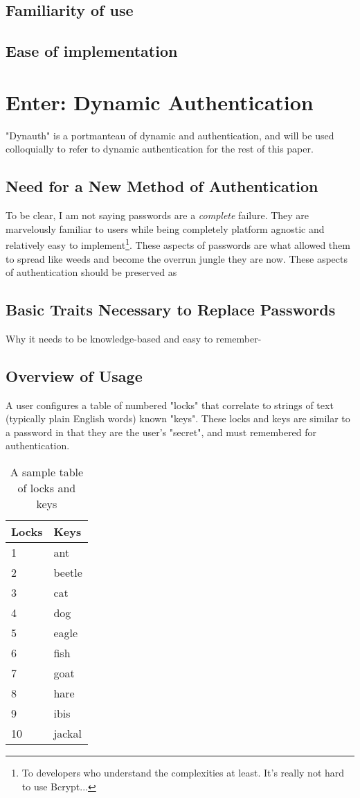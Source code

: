 \documentclass[conference]{IEEEtran}
\begin{document}
\subsection{Familiarity of use}

\subsection{Ease of implementation}


\section{Enter: Dynamic Authentication}
	"Dynauth" is a portmanteau of dynamic and authentication, and will be used colloquially to refer to dynamic authentication for the rest of this paper.
\subsection{Need for a New Method of Authentication}
	To be clear, I am not saying passwords are a \textit{complete} failure. They are marvelously familiar to users while being completely platform agnostic and relatively easy to implement\footnote{To developers who understand the complexities at least. It's really not hard to use Bcrypt...}. These aspects of passwords are what allowed them to spread like weeds and become the overrun jungle they are now. These aspects of authentication should be preserved as 
\subsection{Basic Traits Necessary to Replace Passwords}
	Why it needs to be knowledge-based and easy to remember-
\subsection{Overview of Usage}
	A user configures a table of numbered "locks" that correlate to strings of text (typically plain English words) known "keys". These locks and keys are similar to a password in that they are the user's "secret", and must remembered for authentication.
	\begin{table}
		\centering
			\begin{tabular}{ | l | l | }
				\hline
				\textbf{Locks} & \textbf{Keys} \\ \hline
				1 & ant \\ \hline
				2 & beetle \\ \hline
				3 & cat \\ \hline
				4 & dog \\ \hline
				5 & eagle \\ \hline
				6 & fish \\ \hline
				7 & goat \\ \hline
				8 & hare \\ \hline
				9 & ibis \\ \hline
				10 & jackal \\
				\hline
			\end{tabular}
		\caption{A sample table of locks and keys}
	\end{table}
\end{document}
